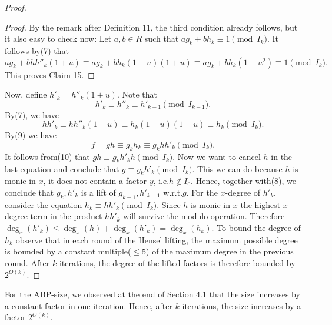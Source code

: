 \begin{proof}
\begin{proof}
By the remark after Definition 11, the third condition already follows, but it also easy to check now:
Let $a,b\in R$ such that $ag_k+bh_k\equiv1\pmod{I_k}$. It follows by(7) that
\[ag_k+bhh''_k(1+u)\equiv ag_k+bh_k(1-u)(1+u)\equiv ag_k+bh_k(1-u^2)\equiv1\pmod{I_k}.\]
This proves Claim 15.
\end{proof}
Now, define $h'_k=h''_k(1+u)$. Note that
\begin{equation}h'_k\equiv h''_k\equiv h'_{k-1}\pmod{I_{k-1}}.\tag{8}\end{equation}
By(7), we have
\begin{equation}hh'_k\equiv hh''_k(1+u)\equiv h_k(1-u)(1+u)\equiv h_k\pmod{I_k}.\tag{9}\end{equation}
By(9) we have
\begin{equation}f=gh\equiv g_kh_k\equiv g_khh'_k\pmod{I_k}.\tag{10}\end{equation}
It follows from(10) that $gh\equiv g_kh'_kh\pmod{I_k}$. Now we want to cancel $h$ in the last equation and conclude that $g\equiv g_kh'_k\pmod{I_k}$. This we can do because $h$ is monic in $x$, it does not contain a factor $y$, i.e.$h\notin I_0$. Hence, together with(8), we conclude that $g_k,h'_k$ is a lift of $g_{k-1},h'_{k-1}$ w.r.t.$g$.
For the $x$-degree of $h'_k$, consider the equation $h_k\equiv hh'_k\pmod{I_k}$. Since $h$ is monic in $x$ the highest $x$-degree term in the product $hh'_k$ will survive the modulo operation. Therefore $\deg_x(h'_k)\leq\deg_x(h)+\deg_x(h'_k)=\deg_x(h_k)$.
To bound the degree of $h_k$ observe that in each round of the Hensel lifting, the maximum possible degree is bounded by a constant multiple($\leq5$) of the maximum degree in the previous round. After $k$ iterations, the degree of the lifted factors is therefore bounded by $2^{O(k)}$.
\end{proof}
For the ABP-size, we observed at the end of Section 4.1 that the size increases by a constant factor in one iteration. Hence, after $k$ iterations, the size increases by a factor $2^{O(k)}$.
